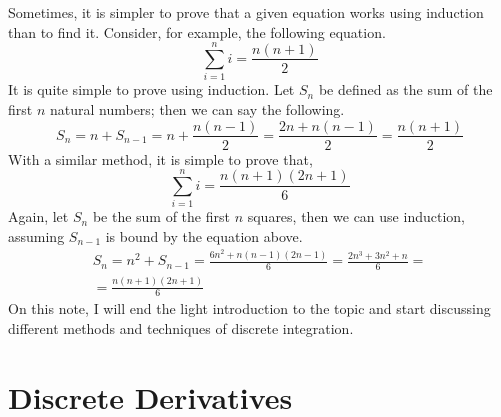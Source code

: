 \documentclass{article}
\begin{document}
Sometimes, it is simpler to prove that a given equation works using induction than to find it. Consider, for example, the following equation.
\begin{equation}
	\sum_{i = 1}^n i = \frac{n(n + 1)}{2}
\end{equation}
It is quite simple to prove using induction. Let \(S_n\) be defined as the sum of the first \(n\) natural numbers; then we can say the following.
\begin{equation}
	S_n = n + S_{n - 1} = n + \frac{n(n - 1)}{2} = \frac{2n + n(n - 1)}{2} = \frac{n(n + 1)}{2}
\end{equation}
With a similar method, it is simple to prove that,
\begin{equation}
	\sum_{i = 1}^n i = \frac{n(n + 1)(2n + 1)}{6}
\end{equation}
Again, let \(S_n\) be the sum of the first \(n\) squares, then we can use induction, assuming \(S_{n - 1}\) is bound by the equation above.
\begin{multline}
	S_n = n^2 + S_{n - 1} = \frac{6n^2 + n(n - 1)(2n - 1)}{6} = \frac{2n^3 + 3n^2 + n}{6} = \\
	= \frac{n(n + 1)(2n + 1)}{6}
\end{multline}
On this note, I will end the light introduction to the topic and start discussing different methods and techniques of discrete integration.

\section{Discrete Derivatives}
\end{document}
